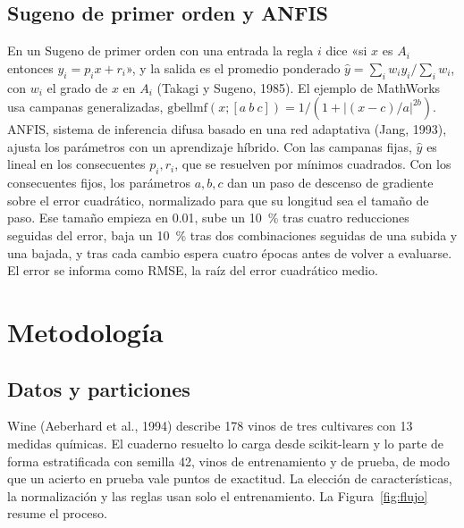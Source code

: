 \documentclass[11pt,letterpaper]{article}
\begin{document}
\subsection{Sugeno de primer orden y ANFIS}

En un Sugeno de primer orden con una entrada la regla $i$ dice «si $x$ es $A_i$ entonces $y_i=p_i x + r_i$», y la salida es el promedio ponderado $\hat y = \sum_i w_i y_i/\sum_i w_i$, con $w_i$ el grado de $x$ en $A_i$ (Takagi y Sugeno, 1985). El ejemplo de MathWorks usa campanas generalizadas, $\mathrm{gbellmf}(x;[a\ b\ c]) = 1/(1+|(x-c)/a|^{2b})$. ANFIS, sistema de inferencia difusa basado en una red adaptativa (Jang, 1993), ajusta los parámetros con un aprendizaje híbrido. Con las campanas fijas, $\hat y$ es lineal en los consecuentes $p_i, r_i$, que se resuelven por mínimos cuadrados. Con los consecuentes fijos, los parámetros $a, b, c$ dan un paso de descenso de gradiente sobre el error cuadrático, normalizado para que su longitud sea el tamaño de paso. Ese tamaño empieza en 0.01, sube un 10~\% tras cuatro reducciones seguidas del error, baja un 10~\% tras dos combinaciones seguidas de una subida y una bajada, y tras cada cambio espera cuatro épocas antes de volver a evaluarse. El error se informa como RMSE, la raíz del error cuadrático medio.

\section{Metodología}

\subsection{Datos y particiones}

Wine (Aeberhard et al., 1994) describe 178 vinos de tres cultivares con 13 medidas químicas. El cuaderno resuelto lo carga desde scikit-learn y lo parte de forma estratificada con semilla 42, \nTr{} vinos de entrenamiento y \nTe{} de prueba, de modo que un acierto en prueba vale \puntoPrueba{} puntos de exactitud. La elección de características, la normalización y las reglas usan solo el entrenamiento. La Figura~\ref{fig:flujo} resume el proceso.
\end{document}
